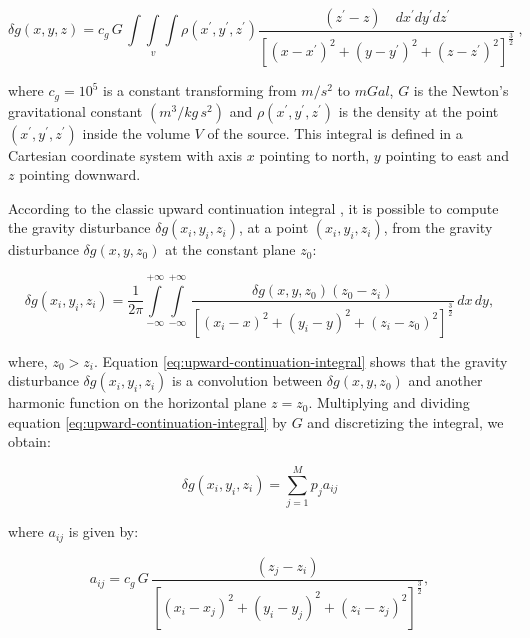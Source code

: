 \documentclass[paper]{geophysics}
\begin{document}
\begin{equation}
\delta g(x, y, z) = c_{g} \, G \, \int\int\limits_{v}\int \rho(x^{\prime}, y^{\prime}, z^{\prime}) \frac{(z^{\prime} - z) \quad dx^{\prime}dy^{\prime}dz^{\prime}}{[(x - x^{\prime})^{2} + (y - y^{\prime})^{2} + (z - z^{\prime})^{2}]^{\frac{3}{2}}}\: ,
\label{eq:gravity-disturbance}
\end{equation}

where $c_{g} = 10^5$ is a constant transforming from $m/s^2$ to $mGal$, $G$ is the Newton's gravitational constant $(m^3/kg \, s^2)$ and $\rho(x^{\prime}, y^{\prime}, z^{\prime})$ is the density at the point $(x^{\prime}, y^{\prime}, z^{\prime})$ inside the volume $V$ of the source. This integral is defined in a Cartesian coordinate system with axis $x$ pointing to north, $y$ pointing to east and $z$ pointing downward.

According to the classic upward continuation integral \citep{henderson1960comprehensive, henderson1970validity}, it is possible to compute the gravity disturbance $\delta g(x_{i}, y_{i}, z_{i})$, at a point $(x_i, y_i, z_i)$, from the gravity disturbance $\delta g(x, y, z_{0})$ at the constant plane $z_{0}$:

\begin{equation}
\delta g(x_i, y_i, z_i) = \frac{1}{2\pi}  \int\limits_{-\infty}^{+\infty} \int\limits_{-\infty}^{+\infty} \,
\frac{\delta g(x, y, z_0) (z_{0} - z_{i})}{\left[(x_{i} - x)^{2} +
	(y_{i} - y)^{2} +
	(z_{i} - z_{0})^{2} \right]^{\frac{3}{2}}} \, 
dx \, dy,
\label{eq:upward-continuation-integral}
\end{equation}

where, $z_0 > z_i$.
Equation \ref{eq:upward-continuation-integral} shows that the gravity disturbance $\delta g(x_{i}, y_{i}, z_{i})$ is a convolution between $\delta g(x, y, z_{0})$ and another harmonic function on the horizontal plane $z=z_0$.
Multiplying and dividing equation \ref{eq:upward-continuation-integral} by $G$ and discretizing the integral, we obtain:

\begin{equation}
\delta g(x_{i}, y_{i}, z_{i}) = \sum_{j=1}^{M} p_j a_{ij}
\label{eq:integral-sum}
\end{equation}

where $a_{ij}$ is given by:

\begin{equation}
a_{ij}= c_{g} \, G \, \frac{(z_{j} - z_{i})}{\left[(x_{i} - x_{j})^{2} +	(y_{i} - y_{j})^{2} +	(z_{i} - z_{j})^{2} \right]^{\frac{3}{2}}},
\label{eq:aij}
\end{equation}
\end{document}
